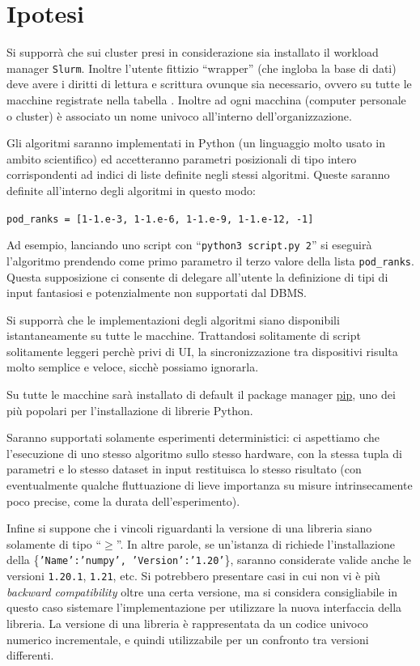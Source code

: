 \documentclass{article}
\begin{document}
\section{Ipotesi}
\label{sec:ipotesi}
Si supporrà che sui cluster presi in considerazione sia installato il workload manager \texttt{Slurm}. Inoltre l'utente fittizio ``wrapper'' (che ingloba la base di dati) deve avere i diritti di lettura e scrittura ovunque sia necessario, ovvero su tutte le macchine registrate nella tabella . Inoltre ad ogni macchina (computer personale o cluster) è associato un nome univoco all'interno dell'organizzazione.

Gli algoritmi saranno implementati in Python (un linguaggio molto usato in ambito scientifico) ed accetteranno parametri posizionali di tipo intero corrispondenti ad indici di liste definite negli stessi algoritmi. Queste saranno definite all'interno degli algoritmi in questo modo:

\verb|pod_ranks = [1-1.e-3, 1-1.e-6, 1-1.e-9, 1-1.e-12, -1]|

Ad esempio, lanciando uno script con ``\texttt{python3 script.py 2}'' si eseguirà l'algoritmo prendendo come primo parametro il terzo valore della lista \texttt{pod\_ranks}. Questa supposizione ci consente di delegare all'utente la definizione di tipi di input fantasiosi e potenzialmente non supportati dal DBMS.

Si supporrà che le implementazioni degli algoritmi siano disponibili istantaneamente su tutte le macchine. Trattandosi solitamente di script solitamente leggeri perchè privi di UI, la sincronizzazione tra dispositivi risulta molto semplice e veloce, sicchè possiamo ignorarla.

Su tutte le macchine sarà installato di default il package manager \href{https://pypi.org/project/pip/}{pip}, uno dei più popolari per l'installazione di librerie Python.

Saranno supportati solamente esperimenti deterministici: ci aspettiamo che l'esecuzione di uno stesso algoritmo sullo stesso hardware, con la stessa tupla di parametri e lo stesso dataset in input restituisca lo stesso risultato (con eventualmente qualche fluttuazione di lieve importanza su misure intrinsecamente poco precise, come la durata dell'esperimento).

Infine si suppone che i vincoli riguardanti la versione di una libreria siano solamente di tipo ``$\geq$''. In altre parole, se un'istanza di  richiede l'installazione della  \{\texttt{'Name':'numpy', 'Version':'1.20'}\}, saranno considerate valide anche le versioni \texttt{1.20.1}, \texttt{1.21}, etc. Si potrebbero presentare casi in cui non vi è più \emph{backward compatibility} oltre una certa versione, ma si considera consigliabile in questo caso sistemare l'implementazione per utilizzare la nuova interfaccia della libreria. La versione di una libreria è rappresentata da un codice univoco numerico incrementale, e quindi utilizzabile per un confronto tra versioni differenti.
\end{document}
